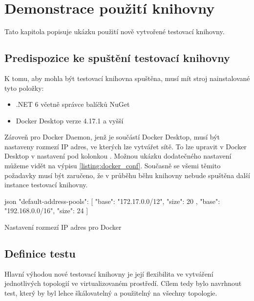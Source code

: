 \chapter{Demonstrace použití knihovny}\label{chap:demonstration}

Tato kapitola popisuje ukázku použití nově vytvořené testovací knihovny.


\section{Predispozice ke spuštění testovací knihovny}\label{sec:test_requirements}

K tomu, aby mohla být testovací knihovna spuštěna, musí mít stroj nainstalované tyto položky:

\begin{itemize}
    \item .NET 6 včetně správce balíčků NuGet
    \item Docker Desktop verze 4.17.1 a vyšší
\end{itemize}

Zároveň pro Docker Daemon, jenž je součástí Docker Desktop, musí být nastaveny rozmezí IP adres, ve kterých lze vytvářet sítě. To lze upravit v Docker Desktop v nastavení pod kolonkou . Možnou ukázku dodatečného nastavení můžeme vidět na výpisu \ref{listing:docker_conf}. Současně se všemi těmito požadavky musí být zaručeno, že v průběhu běhu knihovny nebude spuštěna další instance testovací knihovny.

\begin{listing}[htbp]
    \centering
    \begin{cminted}{json}
"default-address-pools": [
    {
      "base": "172.17.0.0/12",
      "size": 20
    },
    {
      "base": "192.168.0.0/16",
      "size": 24
    }
]
    \end{cminted}
\caption{Nastavení rozmezí IP adres pro Docker}
\label{listing:docker_conf}
\end{listing}


\section{Definice testu}\label{sec:modbus_test}

Hlavní výhodou nové testovací knihovny je její flexibilita ve vytváření jednotlivých topologií ve virtualizovaném prostředí. Cílem tedy bylo navrhnout test, který by byl lehce škálovatelný a použitelný na všechny topologie. 

